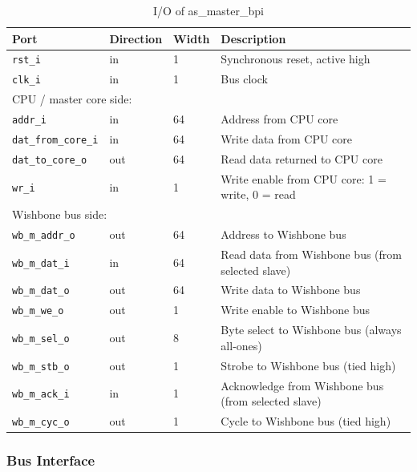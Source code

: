\begin{table}[H]
\caption{I/O of as\_master\_bpi}
\label{tab:asMasterBpiIO}
\centering
\begin{tabularx}{\textwidth}{|l |l |l |X|}
  \hline
  Port & Direction & Width & Description \\
  \hline
  \hline
  \texttt{rst\_i}             & in  & 1  & Synchronous reset, active high \\
  \hline
  \texttt{clk\_i}             & in  & 1  & Bus clock \\
  \hline
  \multicolumn{4}{|l|}{CPU / master core side:} \\
  \hline
  \texttt{addr\_i}            & in  & 64 & Address from CPU core \\
  \hline
  \texttt{dat\_from\_core\_i} & in  & 64 & Write data from CPU core \\
  \hline
  \texttt{dat\_to\_core\_o}   & out & 64 & Read data returned to CPU core \\
  \hline
  \texttt{wr\_i}              & in  & 1  & Write enable from CPU core: 1 = write, 0 = read \\
  \hline
  \multicolumn{4}{|l|}{Wishbone bus side:} \\
  \hline
  \texttt{wb\_m\_addr\_o}     & out & 64 & Address to Wishbone bus \\
  \hline
  \texttt{wb\_m\_dat\_i}      & in  & 64 & Read data from Wishbone bus (from selected slave) \\
  \hline
  \texttt{wb\_m\_dat\_o}      & out & 64 & Write data to Wishbone bus \\
  \hline
  \texttt{wb\_m\_we\_o}       & out & 1  & Write enable to Wishbone bus \\
  \hline
  \texttt{wb\_m\_sel\_o}      & out & 8  & Byte select to Wishbone bus (always all-ones) \\
  \hline
  \texttt{wb\_m\_stb\_o}      & out & 1  & Strobe to Wishbone bus (tied high) \\
  \hline
  \texttt{wb\_m\_ack\_i}      & in  & 1  & Acknowledge from Wishbone bus (from selected slave) \\
  \hline
  \texttt{wb\_m\_cyc\_o}      & out & 1  & Cycle to Wishbone bus (tied high) \\
  \hline
\end{tabularx}
\end{table}

\subsubsection{Bus Interface}

